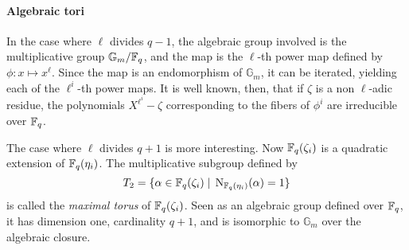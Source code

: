 \documentclass{sig-alternate}
\begin{document}
\paragraph{Algebraic tori}
In the case where $\ell$ divides $q-1$, the algebraic group involved
is the multiplicative group $\mathbb{G}_m/\mathbb{F}_q$, and the map is the
$\ell$-th power map defined by $\phi:x\mapsto x^\ell$. Since the map
is an endomorphism of $\mathbb{G}_m$, it can be iterated, yielding
each of the $\ell^i$-th power maps. It is well known, then, that if
$\zeta$ is a non $\ell$-adic residue, the polynomials
$X^{\ell^i}-\zeta$ corresponding to the fibers of $\phi^i$ are
irreducible over $\mathbb{F}_q$.

The case where $\ell$ divides $q+1$ is more interesting. Now
$\mathbb{F}_q(\zeta_i)$ is a quadratic extension of $\mathbb{F}_q(\eta_i)$. The
multiplicative subgroup defined by
\begin{equation}
  \label{eq:T2-def}
  T_2 = \{\alpha\in\mathbb{F}_q(\zeta_i) \;|\; \operatorname{N}_{\mathbb{F}_q(\eta_i)}(\alpha) = 1\}
\end{equation}
is called the \emph{maximal torus} of $\mathbb{F}_q(\zeta_i)$. Seen as an
algebraic group defined over $\mathbb{F}_q$, it has dimension one, cardinality
$q+1$, and is isomorphic to $\mathbb{G}_m$ over the algebraic closure.
\end{document}

